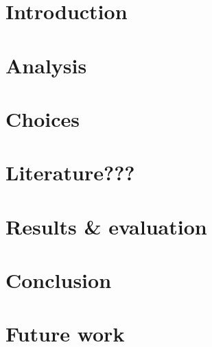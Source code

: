 \documentclass[a4paper,10pt]{article}
\begin{document}

\tableofcontents


\section{Introduction}
\label{sec:introduction}


\section{Analysis}
\label{sec:analysis}


\section{Choices}
\label{sec:choices}


\section{Literature???}
\label{sec:literature}


%

\section{Results \& evaluation}
\label{sec:results}


\section{Conclusion}
\label{sec:conclusion}


\section{Future work}
\label{sec:future-work}

\end{document}
